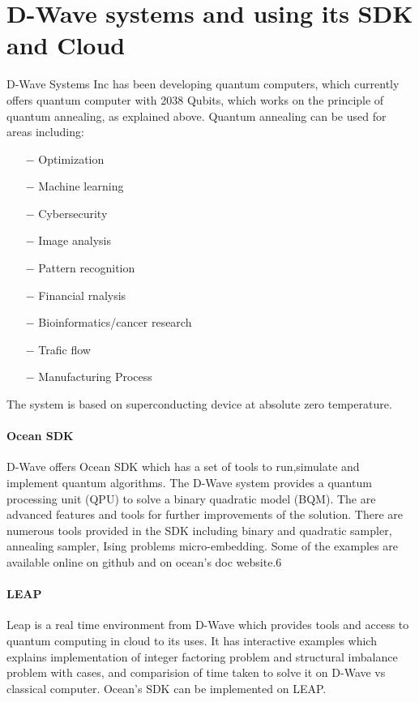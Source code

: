 \documentclass[12pt,conference]{IEEEtran}
\begin{document}
\section{D-Wave systems and using its SDK and Cloud}
D-Wave Systems Inc has been developing quantum computers, which currently offers quantum computer with 2038 Qubits, which works on the principle of quantum annealing, as explained above. Quantum annealing can be used for areas including:\cite{3}
\begin{itemize}
  \item[$-$] Optimization 
  \item[$-$] Machine learning
  \item[$-$] Cybersecurity
  \item[$-$] Image analysis
  \item[$-$] Pattern recognition
  \item[$-$] Financial rnalysis
  \item[$-$] Bioinformatics/cancer research
  \item[$-$] Trafic flow 
  \item[$-$] Manufacturing Process
\end{itemize}

The system is based on superconducting device at absolute zero temperature.

\paragraph{Ocean SDK} D-Wave offers Ocean SDK which has a set of tools to run,simulate and implement quantum algorithms. The D-Wave system provides a quantum processing unit (QPU) to solve a binary quadratic model (BQM). The are advanced features and tools for further improvements of the solution. There are numerous tools provided in the SDK including binary and quadratic sampler, annealing sampler, Ising problems micro-embedding. Some of the examples are available online on github \cite{5} and on ocean's doc website.{6}

\paragraph{LEAP} Leap is a real time environment from D-Wave which provides tools and access to quantum computing in cloud to its uses. It has interactive examples which explains implementation of integer factoring problem and structural imbalance problem with cases, and comparision of time taken to solve it on D-Wave vs classical computer. Ocean's SDK can be implemented on LEAP.
\end{document}
